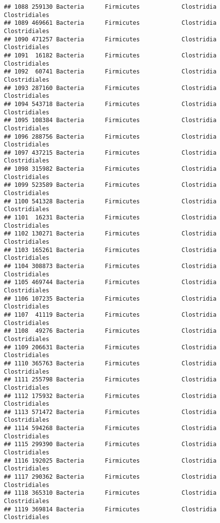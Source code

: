 \documentclass[
]{article}
\begin{document}
\begin{verbatim}
## 1088 259130 Bacteria      Firmicutes            Clostridia       Clostridiales
## 1089 469661 Bacteria      Firmicutes            Clostridia       Clostridiales
## 1090 471257 Bacteria      Firmicutes            Clostridia       Clostridiales
## 1091  16182 Bacteria      Firmicutes            Clostridia       Clostridiales
## 1092  60741 Bacteria      Firmicutes            Clostridia       Clostridiales
## 1093 287160 Bacteria      Firmicutes            Clostridia       Clostridiales
## 1094 543718 Bacteria      Firmicutes            Clostridia       Clostridiales
## 1095 108384 Bacteria      Firmicutes            Clostridia       Clostridiales
## 1096 288756 Bacteria      Firmicutes            Clostridia       Clostridiales
## 1097 437215 Bacteria      Firmicutes            Clostridia       Clostridiales
## 1098 315982 Bacteria      Firmicutes            Clostridia       Clostridiales
## 1099 523589 Bacteria      Firmicutes            Clostridia       Clostridiales
## 1100 541328 Bacteria      Firmicutes            Clostridia       Clostridiales
## 1101  16231 Bacteria      Firmicutes            Clostridia       Clostridiales
## 1102 130271 Bacteria      Firmicutes            Clostridia       Clostridiales
## 1103 165261 Bacteria      Firmicutes            Clostridia       Clostridiales
## 1104 308873 Bacteria      Firmicutes            Clostridia       Clostridiales
## 1105 469744 Bacteria      Firmicutes            Clostridia       Clostridiales
## 1106 107235 Bacteria      Firmicutes            Clostridia       Clostridiales
## 1107  41119 Bacteria      Firmicutes            Clostridia       Clostridiales
## 1108  49276 Bacteria      Firmicutes            Clostridia       Clostridiales
## 1109 206631 Bacteria      Firmicutes            Clostridia       Clostridiales
## 1110 365763 Bacteria      Firmicutes            Clostridia       Clostridiales
## 1111 255798 Bacteria      Firmicutes            Clostridia       Clostridiales
## 1112 175932 Bacteria      Firmicutes            Clostridia       Clostridiales
## 1113 571472 Bacteria      Firmicutes            Clostridia       Clostridiales
## 1114 594268 Bacteria      Firmicutes            Clostridia       Clostridiales
## 1115 299390 Bacteria      Firmicutes            Clostridia       Clostridiales
## 1116 192025 Bacteria      Firmicutes            Clostridia       Clostridiales
## 1117 290362 Bacteria      Firmicutes            Clostridia       Clostridiales
## 1118 365310 Bacteria      Firmicutes            Clostridia       Clostridiales
## 1119 369814 Bacteria      Firmicutes            Clostridia       Clostridiales

\end{verbatim}
\end{document}
